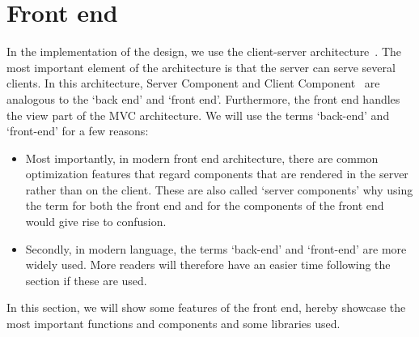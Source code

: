 \section{Front end}\label{sec:front-end}

In the implementation of the design, we use the client-server architecture~\cite{mathiassen2018}.
The most important element of the architecture is that the server can serve several clients.
In this architecture, Server Component and Client Component~\cite{mathiassen2018} are analogous to the `back end' and
`front end'.
Furthermore, the front end handles the view part of the MVC architecture.
We will use the terms `back-end' and `front-end' for a few reasons:

\begin{itemize}
    \item Most importantly, in modern front end architecture, there are common optimization features that regard
    components that are rendered in the server rather than on the client.
    These are also called `server components' why using the term for both the front end and for the components of the
    front end would give rise to confusion.
    \item Secondly, in modern language, the terms `back-end' and `front-end' are more widely used.
    More readers will therefore have an easier time following the section if these are used.
\end{itemize}

In this section, we will show some features of the front end, hereby showcase the most important functions and
components and some libraries used.





